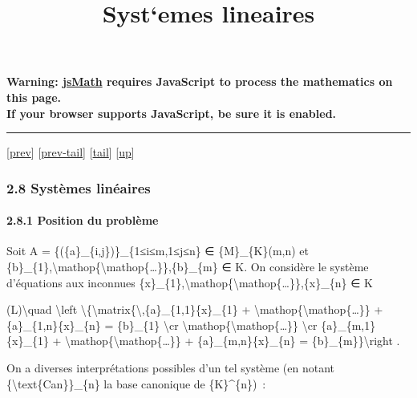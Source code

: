 \documentclass[]{article}
\title{Syst`emes lineaires}
\author{}
\date{}
\begin{document}
\maketitle

\textbf{Warning: \href{http://www.math.union.edu/locate/jsMath}{jsMath}
requires JavaScript to process the mathematics on this page.\\ If your
browser supports JavaScript, be sure it is enabled.}

\begin{center}\rule{3in}{0.4pt}\end{center}

{[}\href{coursse13.html}{prev}{]}
{[}\href{coursse13.html\#tailcoursse13.html}{prev-tail}{]}
{[}\hyperref[tailcoursse14.html]{tail}{]}
{[}\href{coursch3.html\#coursse14.html}{up}{]}

\subsubsection{2.8 Systèmes linéaires}

\paragraph{2.8.1 Position du problème}

Soit A = \{(\{a\}\_\{i,j\})\}\_\{1≤i≤m,1≤j≤n\} ∈ \{M\}\_\{K\}(m,n) et
\{b\}\_\{1\},\textbackslash{}mathop\{\textbackslash{}mathop\{\ldots{}\}\},\{b\}\_\{m\}
∈ K. On considère le système d'équations aux inconnues
\{x\}\_\{1\},\textbackslash{}mathop\{\textbackslash{}mathop\{\ldots{}\}\},\{x\}\_\{n\}
∈ K

(L)\textbackslash{}quad \textbackslash{}left
\textbackslash{}\{\textbackslash{}matrix\{\textbackslash{},\{a\}\_\{1,1\}\{x\}\_\{1\}
+ \textbackslash{}mathop\{\textbackslash{}mathop\{\ldots{}\}\} +
\{a\}\_\{1,n\}\{x\}\_\{n\} = \{b\}\_\{1\} \textbackslash{}cr
\textbackslash{}mathop\{\textbackslash{}mathop\{\ldots{}\}\}
\textbackslash{}cr \{a\}\_\{m,1\}\{x\}\_\{1\} +
\textbackslash{}mathop\{\textbackslash{}mathop\{\ldots{}\}\} +
\{a\}\_\{m,n\}\{x\}\_\{n\} = \{b\}\_\{m\}\}\textbackslash{}right .

On a diverses interprétations possibles d'un tel système (en notant
\{\textbackslash{}text\{Can\}\}\_\{n\} la base canonique de
\{K\}\^{}\{n\})~:
\end{document}
